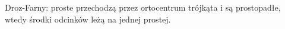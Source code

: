 Droz-Farny: proste przechodzą przez ortocentrum trójkąta i są prostopadłe, wtedy środki odcinków leżą na jednej prostej. %

%





